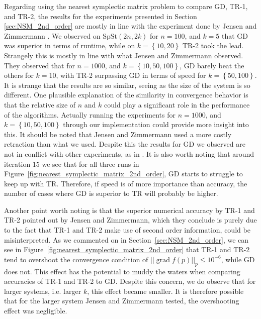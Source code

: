 Regarding using the nearest symplectic matrix problem to compare GD, TR-1, and TR-2, the results for the experiments presented in Section \ref{sec:NSM_2nd_order} are mostly in line with the experiment done by Jensen and Zimmermann \cite[Tbl.~4.1]{JensenZimmermann2024}. We observed on $\mathrm{SpSt}(2n, 2k)$ for $n=100$, and $k=5$ that GD was superior in terms of runtime, while on $k=\left\{ 10,20 \right\}$ TR-2 took the lead. Strangely this is mostly in line with what Jensen and Zimmermann observed. They observed that for $n=1000$, and $k=\left\{ 10,50,100 \right\}$, GD barely beat the others for $k=10$, with TR-2 surpassing GD in terms of speed for $k=\left\{ 50,100 \right\}$. It is strange that the results are so similar, seeing as the size of the system is so different. One plausible explanation of the similarity in convergence behavior is that the relative size of $n$ and $k$ could play a significant role in the performance of the algorithms. Actually running the experiments for $n=1000$, and $k=\left\{ 10,50,100 \right\}$ through our implementation could provide more insight into this. It should be noted that Jensen and Zimmermann used a more costly retraction \cite[Fig.~1]{JensenZimmermann2024} than what we used. Despite this the results for GD we observed are not in conflict with other experiments, as in \cite[Tbl.~1]{BendokatZimmermann2021}. It is also worth noting that around iteration $15$ we see that for all three runs in Figure~\ref{fig:nearest_symplectic_matrix_2nd_order}, GD starts to struggle to keep up with TR. Therefore, if speed is of more importance than accuracy, the number of cases where GD is superior to TR will probably be higher. 

Another point worth noting is that the superior numerical accuracy by TR-1 and TR-2 pointed out by Jensen and Zimmermann, which they conclude is purely due to the fact that TR-1 and TR-2 make use of second order information, could be misinterpreted. As we commented on in Section~\ref{sec:NSM_2nd_order}, we can see in Figure~\ref{fig:nearest_symplectic_matrix_2nd_order} that TR-1 and TR-2 tend to overshoot the convergence condition of $\lvert \lvert \operatorname{grad}f(p) \rvert \rvert_{p}\leq10^{-6}$, while GD does not. This effect has the potential to muddy the waters when comparing accuracies of TR-1 and TR-2 to GD. Despite this concern, we do observe that for larger systems, i.e. larger $k$, this effect became smaller. It is therefore possible that for the larger system Jensen and Zimmermann tested, the overshooting effect was negligible.

